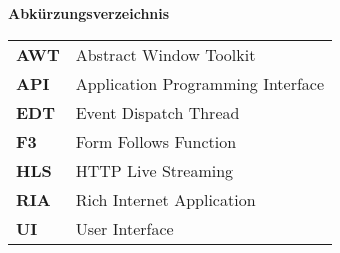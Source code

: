 
\clearpage %

\thispagestyle{plain}


\lhead{} %

\begin{huge}
	\textbf{Abkürzungsverzeichnis}\\
\end{huge}


\begin{tabular}{ l l }
    \textbf{AWT} & Abstract Window Toolkit\\
    \textbf{API} & Application Programming Interface\\
    \textbf{EDT} & Event Dispatch Thread\\
    \textbf{F3} & Form Follows Function\\
    \textbf{HLS} & HTTP Live Streaming\\ 
    \textbf{RIA} & Rich Internet Application\\    
    \textbf{UI} & User Interface\\    
\end{tabular}
